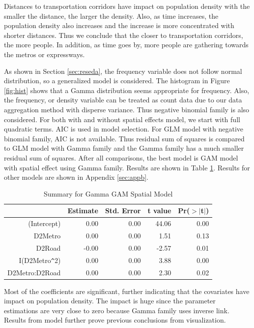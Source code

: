 \documentclass[hidelinks,12pt]{article}
\begin{document}
	Distances to transportation corridors have impact on population density with the smaller the distance, the larger the density. Also, as time increases, the population density also increases and the increase is more concentrated with shorter distances. Thus we conclude that the closer to transportation corridors, the more people. In addition, as time goes by, more people are gathering towards the metros or expressways.
	
	As shown in Section \ref{sec:reseda}, the frequency variable does not follow normal distribution, so a generalized model is considered. The histogram in Figure \ref{fig:hist} shows that a Gamma distribution seems appropriate for frequency. Also, the frequency, or density variable can be treated as count data due to our data aggregation method with disperse variance. Thus negative binomial family is also considered. For both with and without spatial effects model, we start with full quadratic terms. AIC is used in model selection. For GLM model with negative binomial family, AIC is not available. Thus residual sum of squares is compared to GLM model with Gamma family and the Gamma family has a much smaller residual sum of squares. After all comparisons, the best model is GAM model with spatial effect using Gamma family. Results are shown in Table \ref{tbl:bestx}. Results for other models are shown in Appendix \ref{sec:appb}.	
	\begin{table}[ht]
		\centering
		\caption{Summary for Gamma GAM Spatial Model \label{tbl:bestx}}
		\begin{tabular}{rrrrr}
			\hline
			& Estimate & Std. Error & t value & Pr($>$$|$t$|$) \\ 
			\hline
			(Intercept) & 0.00 & 0.00 & 44.06 & 0.00 \\ 
			D2Metro & 0.00 & 0.00 & 1.51 & 0.13 \\ 
			D2Road & -0.00 & 0.00 & -2.57 & 0.01 \\ 
			I(D2Metro\verb|^|2) & 0.00 & 0.00 & 3.88 & 0.00 \\ 
			D2Metro:D2Road & 0.00 & 0.00 & 2.30 & 0.02 \\ 
			\hline
		\end{tabular}
	\end{table}

	Most of the coefficients are significant, further indicating that the covariates have impact on population density. The impact is huge since the parameter estimations are very close to zero because Gamma family uses inverse link. Results from model further prove previous conclusions from visualization.
	
\end{document}
